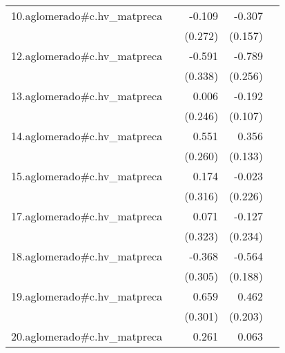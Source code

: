 {\begin{longtable}{l*{4}{D{.}{.}{-1}}}
\addlinespace
10.aglomerado#c.hv\_matpreca&                     &      -0.109         &      -0.307         &                     \\
            &                     &     (0.272)         &     (0.157)         &                     \\
\addlinespace
12.aglomerado#c.hv\_matpreca&                     &      -0.591         &      -0.789\sym{**} &                     \\
            &                     &     (0.338)         &     (0.256)         &                     \\
\addlinespace
13.aglomerado#c.hv\_matpreca&                     &       0.006         &      -0.192         &                     \\
            &                     &     (0.246)         &     (0.107)         &                     \\
\addlinespace
14.aglomerado#c.hv\_matpreca&                     &       0.551\sym{*}  &       0.356\sym{**} &                     \\
            &                     &     (0.260)         &     (0.133)         &                     \\
\addlinespace
15.aglomerado#c.hv\_matpreca&                     &       0.174         &      -0.023         &                     \\
            &                     &     (0.316)         &     (0.226)         &                     \\
\addlinespace
17.aglomerado#c.hv\_matpreca&                     &       0.071         &      -0.127         &                     \\
            &                     &     (0.323)         &     (0.234)         &                     \\
\addlinespace
18.aglomerado#c.hv\_matpreca&                     &      -0.368         &      -0.564\sym{**} &                     \\
            &                     &     (0.305)         &     (0.188)         &                     \\
\addlinespace
19.aglomerado#c.hv\_matpreca&                     &       0.659\sym{*}  &       0.462\sym{*}  &                     \\
            &                     &     (0.301)         &     (0.203)         &                     \\
\addlinespace
20.aglomerado#c.hv\_matpreca&                     &       0.261         &       0.063         &                     \\

\end{longtable}}
